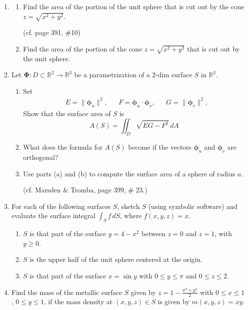 \documentclass{article}
\newcommand{\norm}[1]{\| #1 \|}
\begin{document}
\begin{enumerate}
    \item
    \begin{enumerate}
        \item Find the area of the portion of the unit sphere that is cut out by the cone $z = \sqrt{x^2+y^2}$.

        (cf. page 391, \#10)

        \item Find the area of the portion of the cone $z = \sqrt{x^2+y^2}$ that is cut out by the unit sphere.
    \end{enumerate}

    \item Let $\boldsymbol \Phi : D \subset \mathbb{R}^2 \rightarrow \mathbb{R}^3$ be a parametrization of a 2-dim surface $S$ in $\mathbb{R}^3$.
    \begin{enumerate}
        \item Set
        \begin{align*}
            & E = \norm{\boldsymbol \phi_u}^2,& &F = \boldsymbol \phi_u \cdot \boldsymbol \phi_v, & & G = \norm{\boldsymbol \phi_v}^2,
        \end{align*} 
        Show that the surface area of $S$ is 
        \[ A(S) = \iint_D \sqrt{EG - F^2}\,dA \]
        \item What does the formula for $A(S)$ become if the vectors $\boldsymbol \phi_u$ and $\boldsymbol \phi_v$ are orthogonal?
        \item Use parts (a) and (b) to compute the surface area of a sphere of radius $a$.

        (cf. Marsden \& Tromba, page 399, \# 23.)
    \end{enumerate}
    \item For each of the following surfaces $S$, sketch $S$ (using symbolic software) and evaluate the surface integral $\int_S f \, dS$, where $f(x,y,z) = x$.
    \begin{enumerate}
        \item $S$ is that part of the surface $y=4-x^2$ between $z = 0$ and $z = 1$, with $y\geq 0$.
        \item $S$ is the upper half of the unit sphere centered at the origin.
        \item $S$ is that part of the surface $x = \sin y$ with $0 \leq y \leq \pi$ and $0 \leq z \leq 2$.
    \end{enumerate}

    \item Find the mass of the metallic surface $S$ given by $\displaystyle z = 1 - \frac{x^2 + y^2}{2}$ with $0 \leq x \leq 1$, $0 \leq y \leq 1$, if the mass density at $(x,y,z) \in S$ is given by $m(x,y,z) = xy$.
\end{enumerate}
\end{document}
